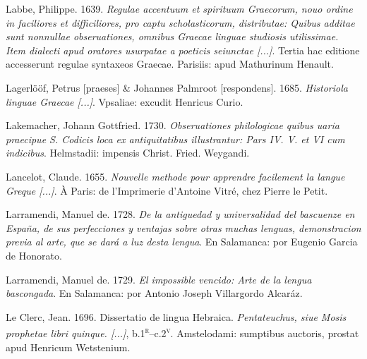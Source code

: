 \begin{styleStandard}
Labbe, Philippe. 1639. \textit{Regulae accentuum et spirituum Graecorum, nouo ordine in faciliores et difficiliores, pro captu scholasticorum, distributae: Quibus additae sunt nonnullae obseruationes, omnibus Graecae linguae studiosis utilissimae. Item dialecti apud oratores usurpatae a poeticis seiunctae [...]}. Tertia hac editione accesserunt regulae syntaxeos Graecae. Parisiis: apud Mathurinum Henault.
\end{styleStandard}

\begin{styleStandard}
Lagerlööf, Petrus [praeses] \& Johannes Palmroot [respondens]. 1685. \textit{Historiola linguae Graecae [...]}. Vpsaliae: excudit Henricus Curio.
\end{styleStandard}

\begin{styleStandard}
Lakemacher, Johann Gottfried. 1730. \textit{Obseruationes philologicae quibus uaria praecipue S. Codicis loca ex antiquitatibus illustrantur: Pars IV. V. et VI cum indicibus}. Helmstadii: impensis Christ. Fried. Weygandi.
\end{styleStandard}

\begin{styleStandard}
Lancelot, Claude. 1655. \textit{Nouvelle methode pour apprendre facilement la langue Greque [...]}. À Paris: de l’Imprimerie d’Antoine Vitré, chez Pierre le Petit.
\end{styleStandard}

\begin{styleStandard}
Larramendi, Manuel de. 1728. \textit{De la antiguedad y universalidad del bascuenze en España, de sus perfecciones y ventajas sobre otras muchas lenguas, demonstracion previa al arte, que se dará a luz desta lengua}. En Salamanca: por Eugenio Garcia de Honorato.
\end{styleStandard}

\begin{styleStandard}
Larramendi, Manuel de. 1729. \textit{El impossible vencido: Arte de la lengua bascongada}. En Salamanca: por Antonio Joseph Villargordo Alcaráz.
\end{styleStandard}

\begin{styleStandard}
Le Clerc, Jean. 1696. Dissertatio de lingua Hebraica. \textit{Pentateuchus, siue Mosis prophetae libri quinque. [...]}, b.1\textsc{\textsuperscript{r}}–c.2\textsc{\textsuperscript{v}}. Amstelodami: sumptibus auctoris, prostat apud Henricum Wetstenium.
\end{styleStandard}

